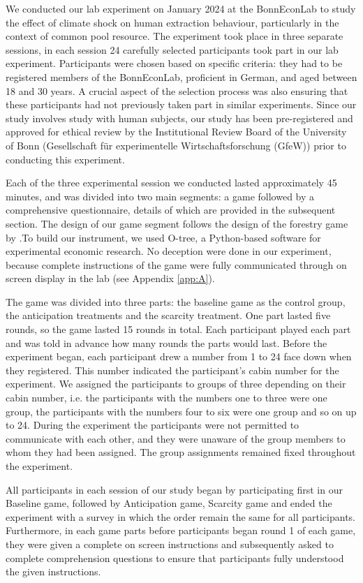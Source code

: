 We conducted our lab experiment on January 2024 at the BonnEconLab to study the effect of climate shock on human extraction behaviour, particularly in the context of common pool resource. The experiment took place in three separate sessions, in each session 24 carefully selected participants took part in our lab experiment. Participants were chosen based on specific criteria: they had to be registered members of the BonnEconLab, proficient in German, and aged between 18 and 30 years. A crucial aspect of the selection process was also ensuring that these participants had not previously taken part in similar experiments. Since our study involves study with human subjects, our study has been pre-registered and approved for ethical review by the Institutional Review Board of the University of Bonn (Gesellschaft f\"ur experimentelle Wirtschaftsforschung (GfeW)) prior to conducting this experiment.

 Each of the three experimental session we conducted lasted approximately 45 minutes, and was divided into two main segments: a game followed by a comprehensive questionnaire, details of which are provided in the subsequent section. The design of our game segment follows the design of the forestry game by \citet{janssen2013breaking}.To build our instrument, we used O-tree, a Python-based software for experimental economic research\citet{chen2016otree}. No deception were done in our experiment, because complete instructions of the game were fully communicated through on screen display in the lab (see Appendix \ref{app:A}).

 The game was divided into three parts: the baseline game as the control group, the anticipation treatments and the scarcity treatment. One part lasted five rounds, so the game lasted 15 rounds in total. Each participant played each part and was told in advance how many rounds the parts would last. Before the experiment began, each participant drew a number from 1 to 24 face down when they registered. This number indicated the participant’s cabin number for the experiment. We assigned the participants to groups of three depending on their cabin number, i.e. the participants with the numbers one to three were one group, the participants with the numbers four to six were one group and so on up to
24. During the experiment the participants were not permitted to communicate with each other, and
they were unaware of the group members to whom they had been assigned. The group assignments
remained fixed throughout the experiment.

All participants in each session of our study began by participating first in our Baseline game, followed by Anticipation game, Scarcity game and ended the experiment with a survey in which the order remain the same for all participants. Furthermore, in each game parts before participants began round 1 of each game, they were given a complete on screen instructions and subsequently asked to complete comprehension questions to ensure that participants fully understood the given instructions.
